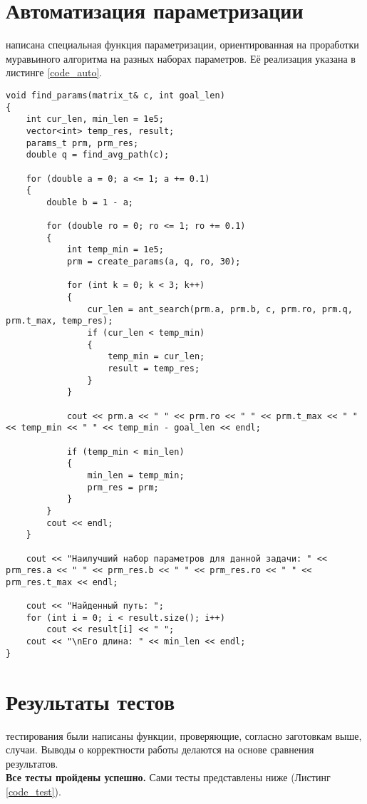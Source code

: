 \section{Автоматизация параметризации}
 написана специальная функция параметризации, ориентированная на проработки муравьиного алгоритма на разных наборах параметров. Её реализация указана в листинге \ref{code_auto}.

\begin{lstlisting}[label=code_auto, caption = Тесты]
void find_params(matrix_t& c, int goal_len)
{
	int cur_len, min_len = 1e5;
	vector<int> temp_res, result;
	params_t prm, prm_res;
	double q = find_avg_path(c);
	
	for (double a = 0; a <= 1; a += 0.1)
	{
		double b = 1 - a;
		
		for (double ro = 0; ro <= 1; ro += 0.1)
		{
			int temp_min = 1e5;
			prm = create_params(a, q, ro, 30);
			
			for (int k = 0; k < 3; k++)
			{
				cur_len = ant_search(prm.a, prm.b, c, prm.ro, prm.q, prm.t_max, temp_res);
				if (cur_len < temp_min)
				{
					temp_min = cur_len;
					result = temp_res;
				}
			}
			
			cout << prm.a << " " << prm.ro << " " << prm.t_max << " " << temp_min << " " << temp_min - goal_len << endl;
			
			if (temp_min < min_len)
			{
				min_len = temp_min;
				prm_res = prm;
			}
		}
		cout << endl;
	}
	
	cout << "Наилучший набор параметров для данной задачи: " << prm_res.a << " " << prm_res.b << " " << prm_res.ro << " " << prm_res.t_max << endl;
	
	cout << "Найденный путь: ";
	for (int i = 0; i < result.size(); i++)
		cout << result[i] << " ";
	cout << "\nЕго длина: " << min_len << endl;
}
\end{lstlisting}

\section{Результаты тестов}
 тестирования были написаны функции, проверяющие, согласно заготовкам выше, случаи. Выводы о корректности работы делаются на основе сравнения результатов.\\

\textbf{Все тесты пройдены успешно.} Сами тесты представлены ниже (Листинг \ref{code_test}).\\

